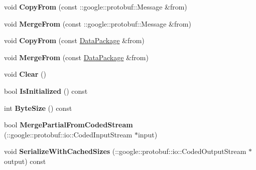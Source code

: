 \begin{DoxyCompactItemize}
\item 
\hypertarget{classstruct_definitions_1_1_data_package_a6b0b1d11a5fc8a51b1ef6dd8c22c04d3}{}\label{classstruct_definitions_1_1_data_package_a6b0b1d11a5fc8a51b1ef6dd8c22c04d3} 
void {\bfseries Copy\+From} (const \+::google\+::protobuf\+::\+Message \&from)
\item 
\hypertarget{classstruct_definitions_1_1_data_package_a5e1e984e8048a4c25fc18e3f5a10bcc0}{}\label{classstruct_definitions_1_1_data_package_a5e1e984e8048a4c25fc18e3f5a10bcc0} 
void {\bfseries Merge\+From} (const \+::google\+::protobuf\+::\+Message \&from)
\item 
\hypertarget{classstruct_definitions_1_1_data_package_abbbda81105770ad8033d42dba174e205}{}\label{classstruct_definitions_1_1_data_package_abbbda81105770ad8033d42dba174e205} 
void {\bfseries Copy\+From} (const \hyperlink{classstruct_definitions_1_1_data_package}{Data\+Package} \&from)
\item 
\hypertarget{classstruct_definitions_1_1_data_package_a9fb97825107e19cf59f3db98d47f871e}{}\label{classstruct_definitions_1_1_data_package_a9fb97825107e19cf59f3db98d47f871e} 
void {\bfseries Merge\+From} (const \hyperlink{classstruct_definitions_1_1_data_package}{Data\+Package} \&from)
\item 
\hypertarget{classstruct_definitions_1_1_data_package_af8ee696e0b7692799a62b4b152bba210}{}\label{classstruct_definitions_1_1_data_package_af8ee696e0b7692799a62b4b152bba210} 
void {\bfseries Clear} ()
\item 
\hypertarget{classstruct_definitions_1_1_data_package_ac7e4e95215398cfb38f57b857cbf4964}{}\label{classstruct_definitions_1_1_data_package_ac7e4e95215398cfb38f57b857cbf4964} 
bool {\bfseries Is\+Initialized} () const
\item 
\hypertarget{classstruct_definitions_1_1_data_package_a515b8b74fac04c8ca1a9c330f37e8224}{}\label{classstruct_definitions_1_1_data_package_a515b8b74fac04c8ca1a9c330f37e8224} 
int {\bfseries Byte\+Size} () const
\item 
\hypertarget{classstruct_definitions_1_1_data_package_aa6563e79fbfcace6aa70722fa82219c0}{}\label{classstruct_definitions_1_1_data_package_aa6563e79fbfcace6aa70722fa82219c0} 
bool {\bfseries Merge\+Partial\+From\+Coded\+Stream} (\+::google\+::protobuf\+::io\+::\+Coded\+Input\+Stream $\ast$input)
\item 
\hypertarget{classstruct_definitions_1_1_data_package_afb6cb29b3e5ff15091772f2462a7bf7f}{}\label{classstruct_definitions_1_1_data_package_afb6cb29b3e5ff15091772f2462a7bf7f} 
void {\bfseries Serialize\+With\+Cached\+Sizes} (\+::google\+::protobuf\+::io\+::\+Coded\+Output\+Stream $\ast$output) const

\end{DoxyCompactItemize}
